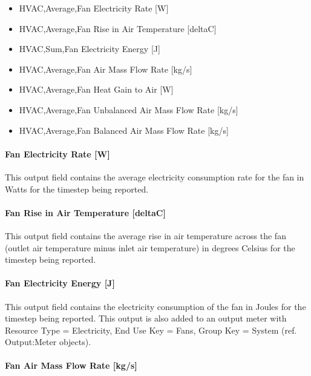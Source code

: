 \begin{itemize}
\item
  HVAC,Average,Fan Electricity Rate {[}W{]}
\item
  HVAC,Average,Fan Rise in Air Temperature {[}deltaC{]}
\item
  HVAC,Sum,Fan Electricity Energy {[}J{]}
\item
  HVAC,Average,Fan Air Mass Flow Rate {[}kg/s{]}
\item
  HVAC,Average,Fan Heat Gain to Air {[}W{]}
\item
  HVAC,Average,Fan Unbalanced Air Mass Flow Rate {[}kg/s{]}
\item
  HVAC,Average,Fan Balanced Air Mass Flow Rate {[}kg/s{]}
\end{itemize}

\paragraph{Fan Electricity Rate {[}W{]}}\label{fan-electric-power-w-3}

This output field contains the average electricity consumption rate for the fan in Watts for the timestep being reported.

\paragraph{Fan Rise in Air Temperature {[}deltaC{]}}\label{fan-rise-in-air-temperature-deltac-3}

This output field contains the average rise in air temperature across the fan (outlet air temperature minus inlet air temperature) in degrees Celsius for the timestep being reported.

\paragraph{Fan Electricity Energy {[}J{]}}\label{fan-electric-energy-j-3}

This output field contains the electricity consumption of the fan in Joules for the timestep being reported. This output is also added to an output meter with Resource Type = Electricity, End Use Key = Fans, Group Key = System (ref. Output:Meter objects).

\paragraph{Fan Air Mass Flow Rate {[}kg/s{]}}\label{fan-air-mass-flow-kgs-3}

